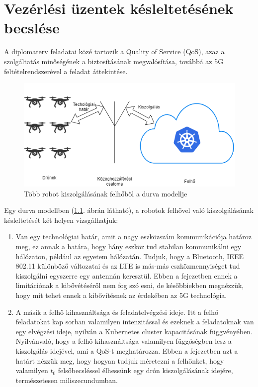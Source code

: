 \chapter{Vezérlési üzentek késleltetésének becslése}
\label{cha:toki}
A diplomaterv feladatai közé tartozik a Quality of Service (QoS), azaz a szolgáltatás minőségének a biztosításának megvalósítása, továbbá az 5G feltételrendszerével a feladat áttekintése.
\begin{figure}
	\centering
	\includegraphics[width=\linewidth]{figures/qos.png}
	\caption{Több robot kiszolgálásának felhőből a durva modellje}
	\label{fig:qos}
\end{figure}
Egy durva modellben (\ref{fig:qos}. ábrán látható), a robotok felhővel való kiszolgálásának késleltetését két helyen vizsgálhatjuk:
\begin{enumerate}
\item Van egy technológiai határ, amit a nagy eszközszám kommunikációja határoz meg, ez annak a határa, hogy hány eszköz tud stabilan kommunikálni egy hálózaton, például az egyetem hálózatán. Tudjuk, hogy a Bluetooth, IEEE 802.11 különböző változatai és az LTE is más-más eszközmennyiséget tud kiszolgálni egyszerre egy antennán keresztül. Ebben a fejezetben ennek a limitációnak a kibővétéséről nem fog szó esni, de későbbiekben megnézzük, hogy mit tehet ennek a kibővítésnek az érdekében az 5G technológia.
\item A másik a felhő kihasználtsága és feladatelvégzési ideje. Itt a felhő feladatokat kap sorban valamilyen intenzitással és ezeknek a feladatoknak van egy elvégzési ideje, nyilván a Kubernetes cluster kapacitásának függvényében. Nyilvánvaló, hogy a felhő kihasználtsága valamilyen függőségben lesz a kiszolgálás idejével, ami a QoS-t meghatározza. Ebben a fejezetben azt a határt nézzük meg, hogy hogyan tudjuk méretezni a felhőnket, hogy valamilyen $t_0$ felsőbecsléssel élhessünk egy drón kiszolgálásának idejére, természetesen miliszecundumban.
\end{enumerate}

